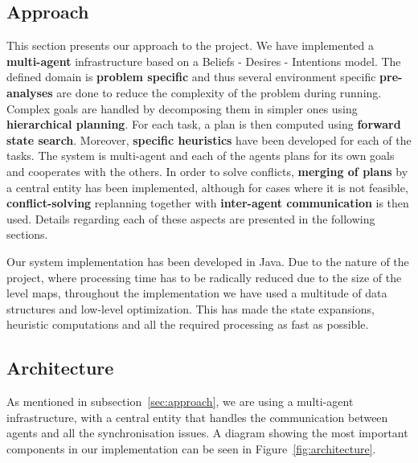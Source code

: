 \subsection{Approach}

\label{sec:approach}

This section presents our approach to the project. We have implemented a \textbf{multi-agent} infrastructure
based on a Beliefs - Desires - Intentions model. The defined domain is \textbf{problem specific} and thus
several environment specific \textbf{pre-analyses} are done to reduce the complexity of the problem during
running. Complex goals are handled by decomposing them in simpler ones using \textbf{hierarchical planning}.
For each task, a plan is then computed using \textbf{forward state search}. Moreover, \textbf{specific
heuristics} have been developed for each of the tasks. The system is multi-agent and each of the agents plans
for its own goals and cooperates with the others. In order to solve conflicts, \textbf{merging of plans} by a
central entity has been implemented, although for cases where it is not feasible, \textbf{conflict-solving}
replanning together with \textbf{inter-agent communication} is then used. Details regarding each of these
aspects are presented in the following sections.

Our system implementation has been developed in Java. Due to the nature of the project, where processing time
has to be radically reduced due to the size of the level maps, throughout the implementation we have used a
multitude of data structures and low-level optimization. This has made the state expansions, heuristic
computations and all the required processing as fast as possible.

\subsection{Architecture}


As mentioned in subsection~\ref{sec:approach}, we are using a multi-agent infrastructure, with a central
entity that handles the communication between agents and all the synchronisation issues. A diagram showing the
most important components in our implementation can be seen in Figure~\ref{fig:architecture}.

